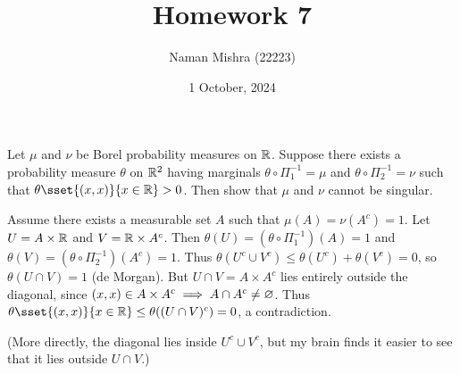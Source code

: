\documentclass[12pt]{article}
\title{Homework 7}
\author{Naman Mishra (22223)}
\date{1 October, 2024}
\begin{document}
\maketitle

\begin{problem*}
    Let $\mu$ and $\nu$ be Borel probability measures on $\mathbb{R}$.
    Suppose there exists a probability measure $\theta$ on $\mathbb{R}^2$ having
    marginals $\theta \circ \Pi_1^{-1} = \mu$
    and $\theta \circ \Pi_2^{-1} = \nu$
    such that $\theta\sset{(x, x)}{x \in \R} > 0$.
    Then show that $\mu$ and $\nu$ cannot be singular.
\end{problem*}
\begin{solution}
    Assume there exists a measurable set $A$ such that
    $\mu(A) = \nu(A^c) = 1$.
    Let $U = A \times \mathbb{R}$ and $V = \mathbb{R} \times A^c$.
    Then $\theta(U) = (\theta \circ \Pi_1^{-1})(A) = 1$ and
    $\theta(V) = (\theta \circ \Pi_2^{-1})(A^c) = 1$.
    Thus $\theta(U^c \cup V^c) \le \theta(U^c) + \theta(V^c) = 0$,
    so $\theta(U \cap V) = 1$ (de Morgan).
    But $U \cap V = A \times A^c$ lies entirely outside the diagonal,
    since $(x, x) \in A \times A^c \implies A \cap A^c \ne \varnothing$.
    Thus $\theta\sset{(x, x)}{x \in \R} \le \theta((U \cap V)^c) = 0$,
    a contradiction.

    (More directly, the diagonal lies inside $U^c \cup V^c$, but my brain
    finds it easier to see that it lies outside $U \cap V$.)
\end{solution}
\end{document}
